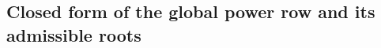 %
%
\subsection{Closed form of the global power row and its admissible roots}
\label{sec:four-cell-closure-result}

